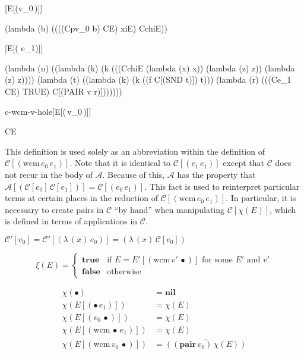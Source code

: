 \documentclass[ms,electronic,twosidetoc,letterpaper,chaptercenter,parttop]{byumsphd}
\newcommand{\nil}{\mathbf{nil}}
\newcommand{\pair}[2]{((\mathbf{pair}\,#1)\,#2)}
\newcommand{\eval}[1]{\overline{#1}}
\newcommand{\C}[1]{\mathcal{C}[#1]}
\newcommand{\Cp}[1]{\mathcal{C}'[#1]}
\newcommand{\abs}[2]{(\lambda\,(#1)\,#2)}
\newcommand{\app}[2]{(#1\,#2)}
\newcommand{\wcm}[2]{(\mathrm{wcm}\,#1\,#2)}
\newcommand{\hole}{\bullet}
\begin{document}
\begin{schemedefn}{\C{E[\app{v_0}{\hole}]}}
\begin{schemedisplay}
(lambda (b) ((((Cpv_0 b) CE) xiE) CchiE))
\end{schemedisplay}
\end{schemedefn}

\begin{schemedefn}{\C{E[\wcm{\hole}{e_1}]}}
\begin{schemedisplay}
(lambda (n) ((lambda (k) 
               (k (((CchiE (lambda (x) x)) (lambda (z) z)) (lambda (z) z))))
             (lambda (t) 
               ((lambda (k) (k ((f C[(SND t)]) t)))
                  (lambda (r) 
                    (((Ce_1 CE) TRUE) C[(PAIR v r)]))))))
\end{schemedisplay}
\end{schemedefn}

\begin{namedschemedefn}{c-wcm-v-hole}{\C{E[\wcm{v_0}{\hole}]}}
\begin{schemedisplay}
CE
\end{schemedisplay}
\end{namedschemedefn}

This definition is used solely as an abbreviation within the definition of
$\C{\wcm{e_0}{e_1}}$. Note that it is identical to $\C{\app{e_1}{e_1}}$ except that
$\mathcal{C}$ does not recur in the body of $\mathcal{A}$. Because of this, $\mathcal{A}$
has the property that $\mathcal{A}[\app{\C{e_0}}{\C{e_1}}]=\C{\app{e_0}{e_1}}$. This fact
is used to reinterpret particular terms at certain places in the reduction of
$\C{\wcm{e_0}{e_1}}$. In particular, it is necessary to create pairs in $\mathcal{C}$ ``by
hand'' when manipulating $\C{\chi(E)}$, which is defined in terms of applications in
$\mathcal{C}$.

\begin{defn}
$\Cp{v_0}=\Cp{\abs{x}{e_0}}=\abs{x}{\C{e_0}}$
\end{defn}

\begin{defn}
\[
\xi(E)=\begin{cases}
\mathbf{true} &\text{if $E=E'[\wcm{v'}{\hole}]$ for some $E'$ and $v'$}\\
\mathbf{false} &\text{otherwise}
\end{cases}
\]
\end{defn}

\begin{defn}
\begin{align*}
\chi(\hole)               &= \nil\\
\chi(E[\app{\hole}{e_1}]) &= \chi(E)\\
\chi(E[\app{v_0}{\hole}]) &= \chi(E)\\
\chi(E[\wcm{\hole}{e_1}]) &= \chi(E)\\
\chi(E[\wcm{v_0}{\hole}]) &= \eval{\pair{v_0}{\chi(E)}}\\
\end{align*}
\end{defn}
\end{document}
